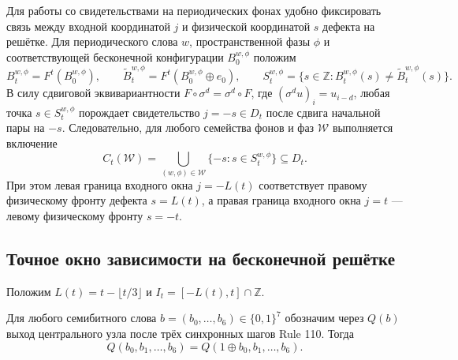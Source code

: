 Для работы со свидетельствами на периодических фонах удобно фиксировать связь между входной координатой $j$ и физической координатой $s$ дефекта на решётке. Для периодического слова $w$, пространственной фазы $\phi$ и соответствующей бесконечной конфигурации $B_0^{w,\phi}$ положим
\begin{equation}\label{eq:diff_support}
B_t^{w,\phi} = F^t(B_0^{w,\phi}), \qquad
\widetilde B_t^{w,\phi} = F^t(B_0^{w,\phi} \oplus e_0), \qquad
S_t^{w,\phi} = \{ s \in \mathbb{Z} : B_t^{w,\phi}(s) \ne \widetilde B_t^{w,\phi}(s) \}.
\end{equation}
В силу сдвиговой эквивариантности $F \circ \sigma^d = \sigma^d \circ F$, где $(\sigma^d u)_i = u_{i-d}$, любая точка $s \in S_t^{w,\phi}$ порождает свидетельство $j = -s \in D_t$ после сдвига начальной пары на $-s$. Следовательно, для любого семейства фонов и фаз $\mathcal{W}$ выполняется включение
\begin{equation}\label{eq:coverage_bridge}
C_t(\mathcal{W}) = \bigcup_{(w,\phi) \in \mathcal{W}} \{ -s : s \in S_t^{w,\phi} \} \subseteq D_t.
\end{equation}
При этом левая граница входного окна $j = -L(t)$ соответствует правому физическому фронту дефекта $s = L(t)$, а правая граница входного окна $j = t$ — левому физическому фронту $s = -t$.

\subsection{Точное окно зависимости на бесконечной решётке}

Положим $L(t) = t - \lfloor t/3 \rfloor$ и $I_t = [-L(t), t] \cap \mathbb{Z}$.

\begin{lemma}\label{lem:three_step}
Для любого семибитного слова $b = (b_0, \dots, b_6) \in \{0, 1\}^7$ обозначим через $Q(b)$ выход центрального узла после трёх синхронных шагов Rule 110. Тогда
\begin{equation}\label{eq:seven_bit}
Q(b_0, b_1, \dots, b_6) = Q(1 \oplus b_0, b_1, \dots, b_6).
\end{equation}
\end{lemma}

